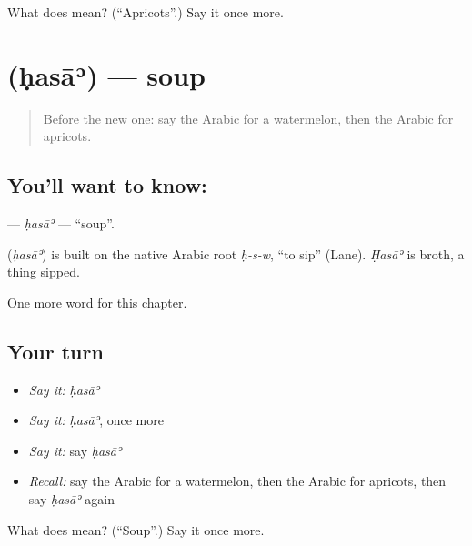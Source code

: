\begin{tcolorbox}[breakable,colback=teal!4,colframe=teal!35!black,title={Before you move on}]
What does  mean? (\textquotedblleft{}Apricots\textquotedblright{}.) Say it once more.
\end{tcolorbox}
\section[\texorpdfstring{\ar{حساء} (ḥasāʾ)}{حساء (ḥasāʾ)}]{ (ḥasāʾ) — soup}

\label{lesson:AR-C130-hasa}



\begin{quote}
Before the new one: say the Arabic for a watermelon, then the Arabic for apricots.
\end{quote}

\subsection*{You'll want to know: }
\textbf{} — \emph{ḥasāʾ} — \textquotedblleft{}soup\textquotedblright{}.

\begin{cousinweb}
\textbf{} (\emph{ḥasāʾ}) is built on the native Arabic root \emph{ḥ-s-w}, \textquotedblleft{}to sip\textquotedblright{} (Lane). \emph{Ḥasāʾ} is broth, a thing sipped.
\end{cousinweb}

\begin{grammarlens}[title={What you've built}]
One more word for this chapter.
\end{grammarlens}

\subsection*{Your turn}
\begin{itemize}
\raggedright
  \item \emph{Say it:} \emph{ḥasāʾ}
  \item \emph{Say it:} \emph{ḥasāʾ}, once more
  \item \emph{Say it:} say \emph{ḥasāʾ}
  \item \emph{Recall:} say the Arabic for a watermelon, then the Arabic for apricots, then say \emph{ḥasāʾ} again
\end{itemize}

\begin{tcolorbox}[breakable,colback=teal!4,colframe=teal!35!black,title={Before you move on}]
What does  mean? (\textquotedblleft{}Soup\textquotedblright{}.) Say it once more.
\end{tcolorbox}
